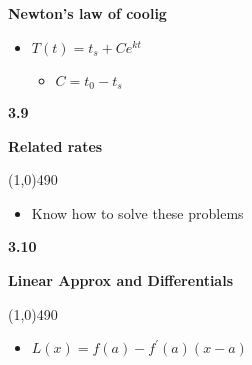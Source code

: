 \documentclass{report}
\begin{document}
   \bigbreak \noindent 
   \begin{mdframed}
       \textbf{Newton's law of coolig}
        \begin{itemize}
            \item $T(t) = t_s + Ce^{kt}$ 
                \begin{itemize}
                    \item $C = t_0 - t_s$
                \end{itemize}
        \end{itemize}
   \end{mdframed}

   \bigbreak \noindent 
   \begin{Large}
       \begin{mdframed}
           \begin{center}
               \textbf{3.9}
           \end{center}
       \end{mdframed}
   \end{Large}
   \begin{Large}
       \begin{center}
           \textbf{Related rates}
       \end{center}
   \end{Large}
   \line(1,0){490}

   \bigbreak \noindent 
   \begin{mdframed}
       \begin{itemize}
           \item Know how to solve these problems
       \end{itemize}
   \end{mdframed}

   \bigbreak \noindent 
   \begin{Large}
       \begin{mdframed}
           \begin{center}
               \textbf{3.10}
           \end{center}
       \end{mdframed}
   \end{Large}
   \begin{Large}
       \begin{center}
           \textbf{Linear Approx and Differentials}
       \end{center}
   \end{Large}
   \line(1,0){490}
   
   \bigbreak \noindent 
   \begin{mdframed}
       \begin{itemize}
           \item $L(x) = f(a) - f^{\prime}(a)(x-a)$
       \end{itemize}
   \end{mdframed}
   
    

    
    
    
    
    
\end{document}
